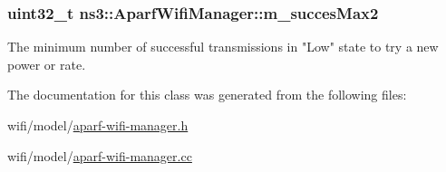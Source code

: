 \subsubsection[{\texorpdfstring{m\+\_\+succes\+Max2}{m_succesMax2}}]{\setlength{\rightskip}{0pt plus 5cm}uint32\+\_\+t ns3\+::\+Aparf\+Wifi\+Manager\+::m\+\_\+succes\+Max2\hspace{0.3cm}{\ttfamily [private]}}\hypertarget{classns3_1_1AparfWifiManager_a8dc983de90c996a4ca0face8366f8bf7}{}\label{classns3_1_1AparfWifiManager_a8dc983de90c996a4ca0face8366f8bf7}


The minimum number of successful transmissions in "Low" state to try a new power or rate. 



The documentation for this class was generated from the following files\+:\begin{DoxyCompactItemize}
\item 
wifi/model/\hyperlink{aparf-wifi-manager_8h}{aparf-\/wifi-\/manager.\+h}\item 
wifi/model/\hyperlink{aparf-wifi-manager_8cc}{aparf-\/wifi-\/manager.\+cc}\end{DoxyCompactItemize}
